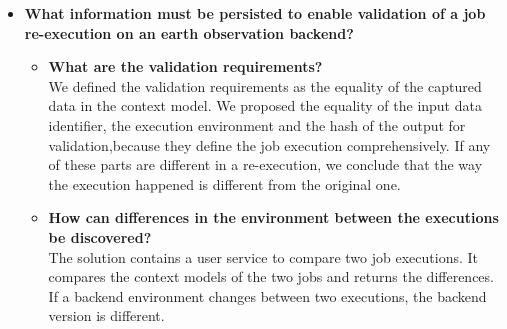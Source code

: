 \documentclass[draft,final]{vutinfth} %
\newcommand{\bgoesswe}[1]{#1}
\begin{document}
\begin{itemize}
	\item \textbf{What information must be persisted to enable validation of a job re-execution on \bgoesswe{an} earth observation backend?}
	\begin{itemize}
		\item \textbf{What are the validation requirements?} \\
		We defined the validation requirements as the equality of the captured data in the context model. We proposed the equality of the input data identifier, the execution environment and the hash of the output for validation,\bgoesswe{because they define the job execution comprehensively. If any of these parts are different in a re-execution, we conclude that the way the execution happened is different from the original one.}
		\item \textbf{How can differences in the environment between the executions be discovered?} \\
		The solution contains a user service to compare two job executions. It compares the context models of the two jobs and returns the differences. If a backend environment changes between two executions, the backend version is different.
	\end{itemize}
\end{itemize}
\end{document}
